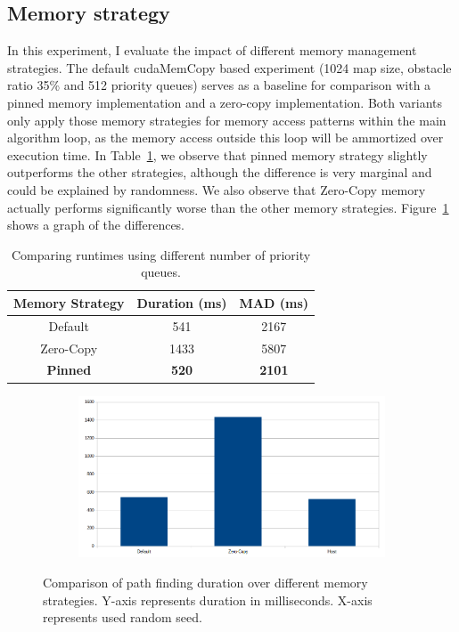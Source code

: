\documentclass{article}
\begin{document}
\subsection{Memory strategy}
%
In this experiment, I evaluate the impact of different memory management strategies. The default cudaMemCopy based experiment (1024 map size, obstacle ratio 35\% and 512 priority queues) serves as a baseline for comparison with a pinned memory implementation and a zero-copy implementation. Both variants only apply those memory strategies for memory access patterns within the main algorithm loop, as the memory access outside this loop will be ammortized over execution time. In Table~\ref{tab:mem_strat}, we observe that pinned memory strategy slightly outperforms the other strategies, although the difference is very marginal and could be explained by randomness. We also observe that Zero-Copy memory actually performs significantly worse than the other memory strategies. Figure~\ref{fig:mem_strat} shows a graph of the differences.
%
\begin{table}[]
    \centering
    \begin{tabular}{|c|c|c|}
        \hline
        \textbf{Memory Strategy} & \textbf{Duration (ms)} & \textbf{MAD (ms)} \\
        \hline
        Default & 541 & 2167 \\
        \hline
        Zero-Copy & 1433 & 5807 \\
        \hline
        \textbf{Pinned} & \textbf{520} & \textbf{2101} \\
        \hline
    \end{tabular}
    \caption{Comparing runtimes using different number of priority queues.}
    \label{tab:mem_strat}
\end{table}
%
\begin{figure}[h]
    \centering
    \begin{subfigure}[b]{1.0\textwidth}
        \centering
        \includegraphics[width=\textwidth]{figures/memory_strategy.png}
    \end{subfigure}
    \hfill
    \caption{Comparison of path finding duration over different memory strategies. Y-axis represents duration in milliseconds. X-axis represents used random seed.}
    \label{fig:mem_strat}
\end{figure}
%
\end{document}
